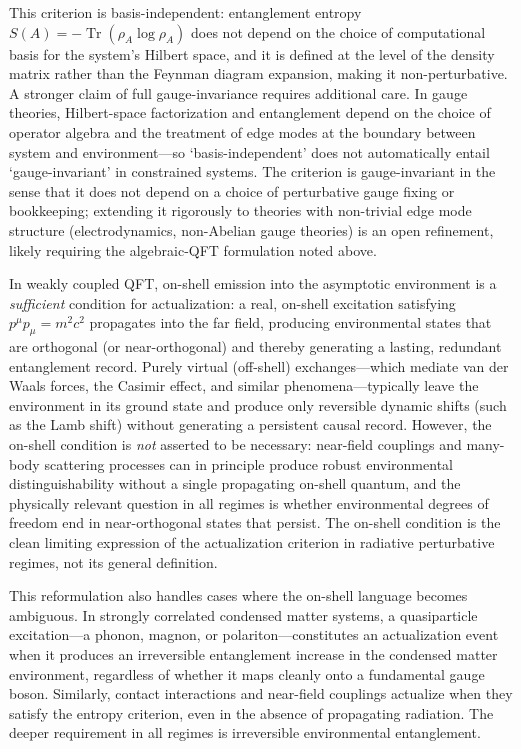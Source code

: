 \documentclass[11pt,a4paper]{article}
\theoremstyle{plain}
\theoremstyle{definition}
\theoremstyle{remark}
\begin{document}
This criterion is basis-independent: entanglement entropy $S(A) = -\operatorname{Tr}(\rho_A
\log \rho_A)$ does not depend on the choice of computational basis for the
system's Hilbert space, and it is defined at the level of the density matrix
rather than the Feynman diagram expansion, making it non-perturbative. A stronger
claim of full gauge-invariance requires additional care. In gauge theories,
Hilbert-space factorization and entanglement depend on the choice of operator
algebra and the treatment of edge modes at the boundary between system and
environment---so `basis-independent' does not automatically entail `gauge-invariant'
in constrained systems. The criterion is gauge-invariant in the sense that it does
not depend on a choice of perturbative gauge fixing or bookkeeping; extending it
rigorously to theories with non-trivial edge mode structure (electrodynamics,
non-Abelian gauge theories) is an open refinement, likely requiring the
algebraic-QFT formulation noted above.

In weakly coupled QFT, on-shell emission into the asymptotic environment is a
\emph{sufficient} condition for actualization: a real, on-shell excitation
satisfying $p^{\mu}p_{\mu} = m^{2}c^{2}$ propagates into the far field, producing
environmental states that are orthogonal (or near-orthogonal) and thereby
generating a lasting, redundant entanglement record. Purely virtual (off-shell)
exchanges---which mediate van der Waals forces, the Casimir effect, and similar
phenomena---typically leave the environment in its ground state and produce only
reversible dynamic shifts (such as the Lamb shift) without generating a persistent
causal record. However, the on-shell condition is \emph{not} asserted to be
necessary: near-field couplings and many-body scattering processes can in
principle produce robust environmental distinguishability without a single
propagating on-shell quantum, and the physically relevant question in all regimes
is whether environmental degrees of freedom end in near-orthogonal states that
persist. The on-shell condition is the clean limiting expression of the
actualization criterion in radiative perturbative regimes, not its general
definition.

This reformulation also handles cases where the on-shell language becomes
ambiguous. In strongly correlated condensed matter systems, a quasiparticle
excitation---a phonon, magnon, or polariton---constitutes an actualization event
when it produces an irreversible entanglement increase in the condensed matter
environment, regardless of whether it maps cleanly onto a fundamental gauge boson.
Similarly, contact interactions and near-field couplings actualize when they
satisfy the entropy criterion, even in the absence of propagating radiation. The
deeper requirement in all regimes is irreversible environmental entanglement.
\end{document}
